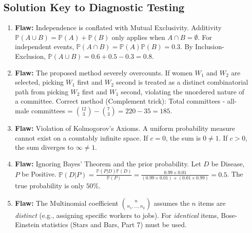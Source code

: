 \documentclass[11pt]{article}
\theoremstyle{definition}
\begin{document}
\subsection*{Solution Key to Diagnostic Testing}
\begin{enumerate}
    \item \textbf{Flaw:} Independence is conflated with Mutual Exclusivity. Additivity $\mathbb{P}(A \cup B) = \mathbb{P}(A) + \mathbb{P}(B)$ only applies when $A \cap B = \emptyset$. For independent events, $\mathbb{P}(A \cap B) = \mathbb{P}(A)\mathbb{P}(B) = 0.3$. By Inclusion-Exclusion, $\mathbb{P}(A \cup B) = 0.6 + 0.5 - 0.3 = 0.8$.
    \item \textbf{Flaw:} The proposed method severely overcounts. If women $W_1$ and $W_2$ are selected, picking $W_1$ first and $W_2$ second is treated as a distinct combinatorial path from picking $W_2$ first and $W_1$ second, violating the unordered nature of a committee. Correct method (Complement trick): Total committees - all-male committees = $\binom{12}{3} - \binom{7}{3} = 220 - 35 = 185$.
    \item \textbf{Flaw:} Violation of Kolmogorov's Axioms. A uniform probability measure cannot exist on a countably infinite space. If $c=0$, the sum is $0 \neq 1$. If $c > 0$, the sum diverges to $\infty \neq 1$.
    \item \textbf{Flaw:} Ignoring Bayes' Theorem and the prior probability. Let $D$ be Disease, $P$ be Positive. $\mathbb{P}(D|P) = \frac{\mathbb{P}(P|D)\mathbb{P}(D)}{\mathbb{P}(P)} = \frac{0.99 \times 0.01}{(0.99 \times 0.01) + (0.01 \times 0.99)} = 0.5$. The true probability is only $50\%$.
    \item \textbf{Flaw:} The Multinomial coefficient $\binom{n}{n_1, \dots, n_k}$ assumes the $n$ items are \textit{distinct} (e.g., assigning specific workers to jobs). For \textit{identical} items, Bose-Einstein statistics (Stars and Bars, Part 7) must be used.
\end{enumerate}
\end{document}
